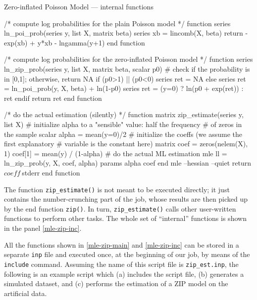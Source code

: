 \begin{script}[htbp]
  \caption{Zero-inflated Poisson Model --- internal functions}
  \label{mle-zip-inc}
\begin{scode}
/* compute log probabilities for the plain Poisson model */
function series ln_poi_prob(series y, list X, matrix beta)
    series xb = lincomb(X, beta)
    return -exp(xb) + y*xb - lngamma(y+1)
end function  

/* compute log probabilities for the zero-inflated Poisson model */
function series ln_zip_prob(series y, list X, matrix beta, scalar p0)
    # check if the probability is in [0,1]; otherwise, return NA
    if (p0>1) || (p0<0)
        series ret = NA
    else
        series ret = ln_poi_prob(y, X, beta) + ln(1-p0)
        series ret = (y=0) ? ln(p0 + exp(ret)) : ret
    endif
    return ret
end function  

/* do the actual estimation (silently) */
function matrix zip_estimate(series y, list X)
    # initialize alpha to a "sensible" value: half the frequency
    # of zeros in the sample
    scalar alpha = mean(y=0)/2
    # initialize the coeffs (we assume the first explanatory 
    # variable is the constant here)
    matrix coef = zeros(nelem(X), 1)
    coef[1] = mean(y) / (1-alpha)
    # do the actual ML estimation
    mle ll = ln_zip_prob(y, X, coef, alpha)
        params alpha coef
    end mle --hessian --quiet
    return $coeff ~ $stderr
end function
\end{scode}
\end{script}

The function \texttt{zip\_estimate()} is not meant to be executed
directly; it just contains the number-crunching part of the job, whose
results are then picked up by the end function \texttt{zip()}. In
turn, \texttt{zip\_estimate()} calls other user-written functions to
perform other tasks. The whole set of ``internal'' functions is shown
in the panel \ref{mle-zip-inc}.

All the functions shown in \ref{mle-zip-main} and \ref{mle-zip-inc} can
be stored in a separate \texttt{inp} file and executed once, at the
beginning of our job, by means of the \texttt{include}
command.  Assuming the name of this script file is
\texttt{zip\_est.inp}, the following is an example script which
(a) includes the script file, (b) generates a simulated dataset,
and (c) performs the estimation of a ZIP model on the artificial data.

